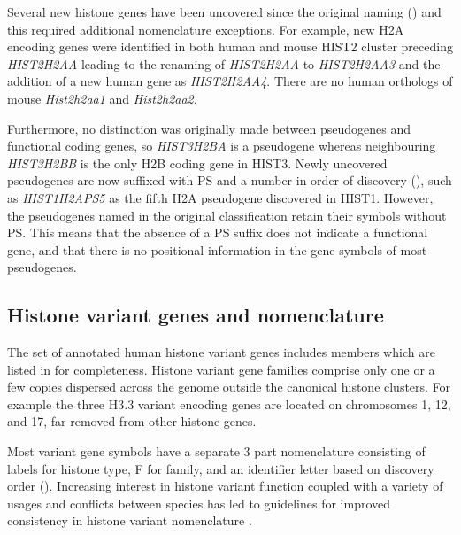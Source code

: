     Several new histone genes have been uncovered since the original
    naming ()
    and this required additional nomenclature exceptions.
    For example, new H2A encoding genes were identified in both human
    and mouse HIST2 cluster preceding \textit{HIST2H2AA}
    leading to the renaming of \textit{HIST2H2AA} to \textit{HIST2H2AA3}
    and the addition of a new human gene as \textit{HIST2H2AA4}.
    There are no human orthologs of mouse \textit{Hist2h2aa1} and \textit{Hist2h2aa2}.

    Furthermore, no distinction was originally made between
    pseudogenes and functional coding genes,
    so \textit{HIST3H2BA} is a pseudogene whereas neighbouring
    \textit{HIST3H2BB} is the only H2B coding gene in HIST3.
    Newly uncovered pseudogenes are now suffixed with PS and a
    number in order of discovery (),
    such as \textit{HIST1H2APS5} as the fifth H2A pseudogene discovered in HIST1.
    However, the pseudogenes named in the original classification retain their symbols without PS.
    This means that the absence of a PS suffix does not indicate a functional gene,
    and that there is no positional information in the gene symbols of most pseudogenes.

  \subsection{Histone variant genes and nomenclature}
    The set of annotated human histone variant genes
    includes \TotalVariantGenes{} members
    which are listed in  for completeness.
    Histone variant gene families comprise only one or a few copies
    dispersed across the genome outside the canonical histone clusters.
    For example the three H3.3 variant encoding genes are located
    on chromosomes 1, 12, and 17, far removed from other histone genes.

    Most variant gene symbols have a separate 3 part nomenclature
    consisting of labels for histone type, F for family,
    and an identifier letter based on discovery order ().
    Increasing interest in histone variant function \citep{MazeAllis2014}
    coupled with a variety of usages and conflicts between species
    has led to guidelines for improved consistency in histone variant nomenclature
    \citep{Talbert2012}.
